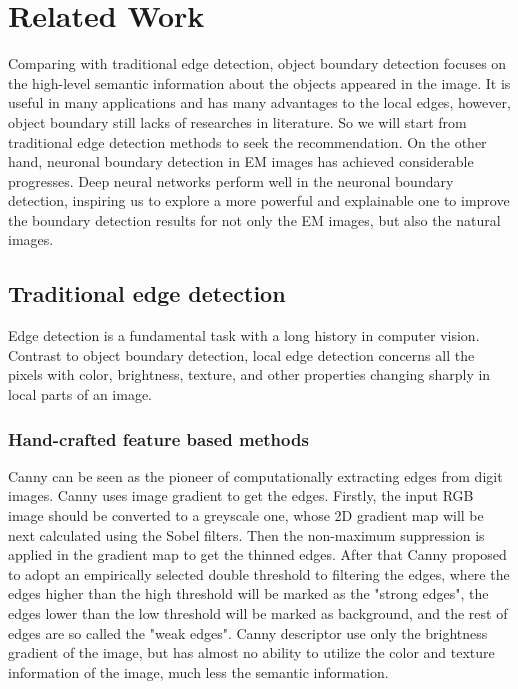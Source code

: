 \documentclass[senior]{IPSstyle}
\begin{document}
\chapter{Related Work} \label{related_work}


Comparing with traditional edge detection, object boundary detection focuses on the high-level semantic information about the objects appeared in the image. It is useful in many applications and has many advantages to the local edges, however, object boundary still lacks of researches in literature. So we will start from traditional edge detection methods to seek the recommendation. On the other hand, neuronal boundary detection in EM images has achieved considerable progresses. Deep neural networks perform well in the neuronal boundary detection, inspiring us to explore a more powerful and explainable one to improve the boundary detection results for not only the EM images, but also the natural images.


\section{Traditional edge detection}

Edge detection is a fundamental task with a long history in computer vision. Contrast to object boundary detection, local edge detection concerns all the pixels with color, brightness, texture, and other properties changing sharply in local parts of an image. 

\subsection{Hand-crafted feature based methods}

Canny\cite{Canny1986} can be seen as the pioneer of computationally extracting edges from digit images. Canny uses image gradient to get the edges. Firstly, the input RGB image should be converted to a greyscale one, whose 2D gradient map will be next calculated using the Sobel\cite{Sobel2014} filters. Then the non-maximum suppression is applied in the gradient map to get the thinned edges. After that Canny proposed to adopt an empirically selected double threshold to filtering the edges, where the edges higher than the high threshold will be marked as the "strong edges", the edges lower than the low threshold will be marked as background, and the rest of edges are so called the "weak edges". Canny descriptor use only the brightness gradient of the image, but has almost no ability to utilize the color and texture information of the image, much less the semantic information.
\end{document}
